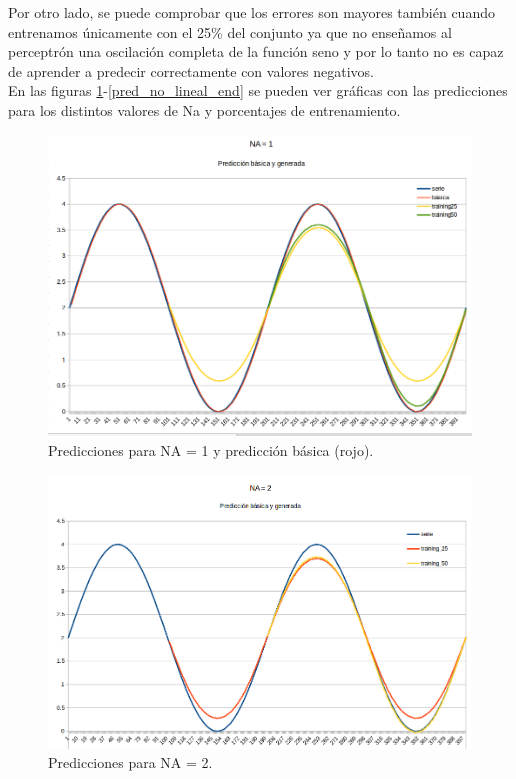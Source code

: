 \documentclass[spanish]{assignment}
\begin{document}
	Por otro lado, se puede comprobar que los errores son mayores también cuando entrenamos únicamente con el 25\% del conjunto ya que no enseñamos al perceptrón una oscilación completa de la función seno y por lo tanto no es capaz de aprender a predecir correctamente con valores negativos.\\
	
	En las figuras \ref{pred_no_lineal_ini}-\ref{pred_no_lineal_end} se pueden ver gráficas con las predicciones para los distintos valores de Na y porcentajes de entrenamiento.\\
	
	\begin{figure}[H]
		\centering
		\includegraphics[scale=0.25]{predNA1.png}		
		\caption{Predicciones para NA = 1 y predicción básica (rojo).}				
		\label{pred_no_lineal_ini}
	\end{figure}
	\begin{figure}[H]
		\centering
		\includegraphics[scale=0.25]{predNA2.png}		
		\caption{Predicciones para NA = 2.}				
	\end{figure}
\end{document}
